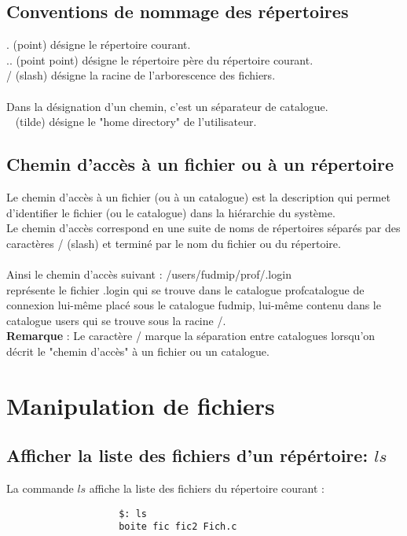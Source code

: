 			\subsection{Conventions de nommage des répertoires}				
				. (point) désigne le répertoire courant.\\
				.. (point point) désigne le répertoire père du répertoire courant.\\
				/ (slash) désigne la racine de l'arborescence des fichiers.\\ \\

				Dans la désignation d'un chemin, c'est un séparateur de catalogue.\\
				~ (tilde) désigne le "home directory"  de l'utilisateur.
			\subsection{Chemin d'accès à un fichier ou à un répertoire}							
				Le chemin d'accès à un fichier (ou à un catalogue) est la description qui permet d'identifier le fichier (ou le catalogue) dans la hiérarchie du 	système.\\
				Le chemin d'accès correspond en une suite de noms de répertoires séparés par des caractères / (slash) et terminé par le nom du fichier ou du répertoire.\\ \\

				 Ainsi le chemin d'accès suivant : /users/fudmip/prof/.login \\
				représente le fichier .login qui se trouve dans le catalogue profcatalogue de connexion lui-même placé sous le catalogue fudmip, lui-même contenu dans le catalogue users qui se trouve sous la racine /.\\
				 \textbf{Remarque} : Le caractère / marque la séparation entre catalogues lorsqu'on décrit le "chemin d'accès" à un fichier ou un catalogue. 

		\section{Manipulation de fichiers}
			\subsection{Afficher la liste des fichiers d'un répértoire: $ls$}
				La commande $ls$ affiche la liste des fichiers du répertoire courant :\\
				\begin{verbatim}	
					$: ls
					boite fic fic2 Fich.c
				\end{verbatim}

